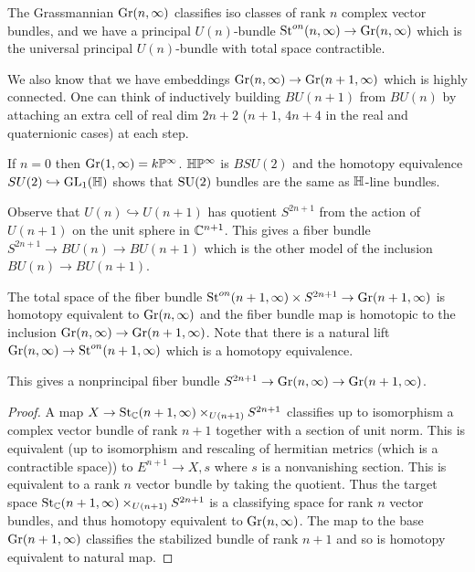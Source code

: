 \documentclass[12pt]{article}
\DeclareMathOperator{\St}{St}
\begin{document}
The Grassmannian $\operatorname{Gr}(n,\infty)$ classifies iso classes of rank $n$ complex vector bundles, and we have a principal $U(n)$-bundle $\St^{on}(n,\infty) \to \Gr(n,\infty)$ which is the universal principal $U(n)$-bundle with total space contractible. 

We also know that we have embeddings $\operatorname{Gr}(n,\infty) \to \operatorname{Gr}(n+1,\infty)$ which is highly connected. One can think of inductively building $BU(n+1)$ from $BU(n)$ by attaching an extra cell of real dim $2n+2$ ($n+1$, $4n+4$ in the real and quaternionic cases) at each step.

\begin{example}
    If $n=0$ then $\operatorname{Gr}(1,\infty) = k\mathbb{P}^\infty$. $\mathbb{H}\mathbb{P}^\infty$ is $BSU(2)$  and the homotopy equivalence $SU(2) \hookrightarrow \operatorname{GL}_1(\mathbb{H})$ shows that $\operatorname{SU}(2)$ bundles are the same as $\mathbb{H}$-line bundles. 
\end{example}

Observe that $U(n) \hookrightarrow U(n+1)$ has quotient $S^{2n+1}$ from the action of $U(n+1)$ on the unit sphere in $\mathbb{C}^{n+1}$. This gives a fiber bundle $S^{2n+1} \to BU(n) \to BU(n+1)$ which is the other model of the inclusion $BU(n) \to BU(n+1)$.

\begin{proposition}
    The total space of the fiber bundle $\St^{on}(n+1,\infty) \times S^{2n+1} \to \Gr(n+1,\infty)$ is homotopy equivalent to $\operatorname{Gr}(n,\infty)$ and the fiber bundle map is homotopic to the inclusion $\operatorname{Gr}(n,\infty) \to \operatorname{Gr}(n+1,\infty)$. Note that there is a natural lift $\Gr(n,\infty) \to \St^{on}(n+1,\infty)$ which is a homotopy equivalence.
\end{proposition}

This gives a nonprincipal fiber bundle $S^{2n+1} \to \operatorname{Gr}(n,\infty) \to \operatorname{Gr}(n+1,\infty)$.

\begin{proof}
    A map $X \to \St_\C(n+1,\infty)\times_{U(n+1)} S^{2n+1}$ classifies up to isomorphism a complex vector bundle of rank $n+1$ together with a section of unit norm. This is equivalent (up to isomorphism and rescaling of hermitian metrics (which is a contractible space)) to $E^{n+1} \to X, s$ where $s$ is a nonvanishing section. This is equivalent to a rank $n$ vector bundle by taking the quotient. Thus the target space $\St_\C(n+1,\infty)\times_{U(n+1)} S^{2n+1}$ is a classifying space for rank $n$ vector bundles, and thus homotopy equivalent to $\operatorname{Gr}(n,\infty)$. The map to the base $\operatorname{Gr}(n+1,\infty)$ classifies the stabilized bundle of rank $n+1$ and so is homotopy equivalent to natural map.
\end{proof}
\end{document}
